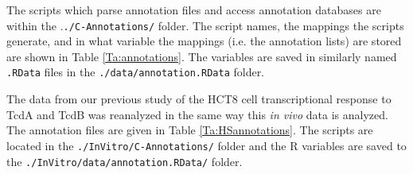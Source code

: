 The scripts which parse annotation files and access annotation databases
are within the .\texttt{./C-Annotations/} folder. The script names, 
the mappings the scripts generate, and in what variable the mappings (i.e. the
annotation lists) are stored 
are shown in Table \ref{Ta:annotations}. The variables are saved in
similarly named \texttt{.RData} files in the
\texttt{./data/annotation.RData} folder.

\begin{table}[h]
  \begin{center}
    \caption[Annotation scripts and variables]{Annotation scripts and variables. ``Affy''=Affymetrix
             Mouse 430 2.0 probeset ID. ``Entrez''=Entrez gene ID,
             ``Ensembl''=Ensembl gene ID}\label{Ta:annotations}
  \end{center}
\end{table}

The data from our previous study of the HCT8 cell transcriptional response 
to TcdA and TcdB was reanalyzed in the same way this \emph{in vivo} data is analyzed. 
The annotation files are given in Table \ref{Ta:HSannotations}. The scripts are located in the 
\texttt{./InVitro/C-Annotations/} folder and the R variables are saved to the
\texttt{./InVitro/data/annotation.RData/} folder.

